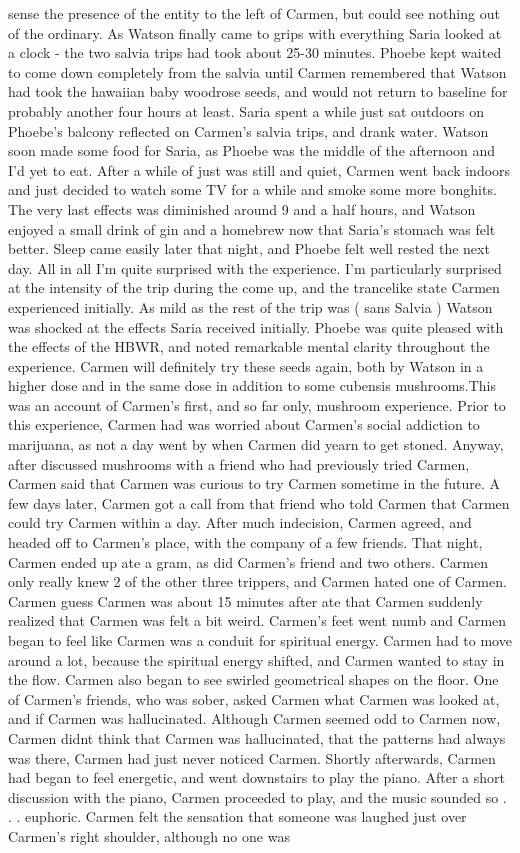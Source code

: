 \documentclass[12pt]{book}
\begin{document}
sense the presence of the entity to the left of Carmen, but could see nothing out of the ordinary. As Watson finally came to grips with everything Saria looked at a clock - the two salvia trips had took about 25-30 minutes. Phoebe kept waited to come down completely from the salvia until Carmen remembered that Watson had took the hawaiian baby woodrose seeds, and would not return to baseline for probably another four hours at least. Saria spent a while just sat outdoors on Phoebe's balcony reflected on Carmen's salvia trips, and drank water. Watson soon made some food for Saria, as Phoebe was the middle of the afternoon and I'd yet to eat. After a while of just was still and quiet, Carmen went back indoors and just decided to watch some TV for a while and smoke some more bonghits. The very last effects was diminished around 9 and a half hours, and Watson enjoyed a small drink of gin and a homebrew now that Saria's stomach was felt better. Sleep came easily later that night, and Phoebe felt well rested the next day. All in all I'm quite surprised with the experience. I'm particularly surprised at the intensity of the trip during the come up, and the trancelike state Carmen experienced initially. As mild as the rest of the trip was ( sans Salvia ) Watson was shocked at the effects Saria received initially. Phoebe was quite pleased with the effects of the HBWR, and noted remarkable mental clarity throughout the experience. Carmen will definitely try these seeds again, both by Watson in a higher dose and in the same dose in addition to some cubensis mushrooms.This was an account of Carmen's first, and so far only, mushroom experience. Prior to this experience, Carmen had was worried about Carmen's social addiction to marijuana, as not a day went by when Carmen did yearn to get stoned. Anyway, after discussed mushrooms with a friend who had previously tried Carmen, Carmen said that Carmen was curious to try Carmen sometime in the future. A few days later, Carmen got a call from that friend who told Carmen that Carmen could try Carmen within a day. After much indecision, Carmen agreed, and headed off to Carmen's place, with the company of a few friends. That night, Carmen ended up ate a gram, as did Carmen's friend and two others. Carmen only really knew 2 of the other three trippers, and Carmen hated one of Carmen. Carmen guess Carmen was about 15 minutes after ate that Carmen suddenly realized that Carmen was felt a bit weird. Carmen's feet went numb and Carmen began to feel like Carmen was a conduit for spiritual energy. Carmen had to move around a lot, because the spiritual energy shifted, and Carmen wanted to stay in the flow. Carmen also began to see swirled geometrical shapes on the floor. One of Carmen's friends, who was sober, asked Carmen what Carmen was looked at, and if Carmen was hallucinated. Although Carmen seemed odd to Carmen now, Carmen didnt think that Carmen was hallucinated, that the patterns had always was there, Carmen had just never noticed Carmen. Shortly afterwards, Carmen had began to feel energetic, and went downstairs to play the piano. After a short discussion with the piano, Carmen proceeded to play, and the music sounded so . . . euphoric. Carmen felt the sensation that someone was laughed just over Carmen's right shoulder, although no one was 
\end{document}
